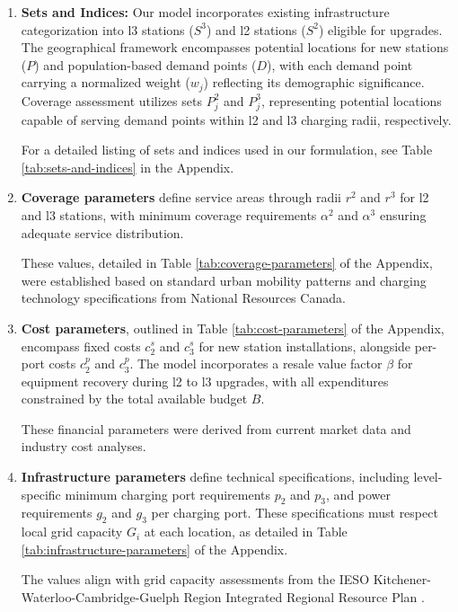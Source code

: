 \begin{enumerate}

    \item \textbf{Sets and Indices:} Our model incorporates existing infrastructure categorization into \gls{l3} stations ($S^3$) and \gls{l2} stations ($S^2$) eligible for upgrades. The geographical framework encompasses potential locations for new stations ($P$) and population-based demand points ($D$), with each demand point carrying a normalized weight ($w_j$) reflecting its demographic significance. Coverage assessment utilizes sets $P^2_j$ and $P^3_j$, representing potential locations capable of serving demand points within \gls{l2} and \gls{l3} charging radii, respectively. 
    
    For a detailed listing of sets and indices used in our formulation, see Table \ref{tab:sets-and-indices} in the Appendix.

    \item \textbf{Coverage parameters} define service areas through radii $r^2$ and $r^3$ for \gls{l2} and \gls{l3} stations, with minimum coverage requirements $\alpha^2$ and $\alpha^3$ ensuring adequate service distribution. 
    
    These values, detailed in Table \ref{tab:coverage-parameters} of the Appendix, were established based on standard urban mobility patterns and charging technology specifications from National Resources Canada. \cite{nrc_electric_2024}

    \item \textbf{Cost parameters}, outlined in Table \ref{tab:cost-parameters} of the Appendix, encompass fixed costs $c_2^s$ and $c_3^s$ for new station installations, alongside per-port costs $c_2^p$ and $c_3^p$. The model incorporates a resale value factor $\beta$ for equipment recovery during \gls{l2} to \gls{l3} upgrades, with all expenditures constrained by the total available budget $B$. \cite{nrc_electric_2024}
    
    These financial parameters were derived from current market data and industry cost analyses. \cite{dinello_what_2022}

    \item \textbf{Infrastructure parameters} define technical specifications, including level-specific minimum charging port requirements $p_2$ and $p_3$, and power requirements $g_2$ and $g_3$ per charging port. These specifications must respect local grid capacity $G_i$ at each location, as detailed in Table \ref{tab:infrastructure-parameters} of the Appendix. 
    
    The values align with grid capacity assessments from the IESO Kitchener-Waterloo-Cambridge-Guelph Region Integrated Regional Resource Plan \cite{ieso_kwc_2021}.
\end{enumerate}

